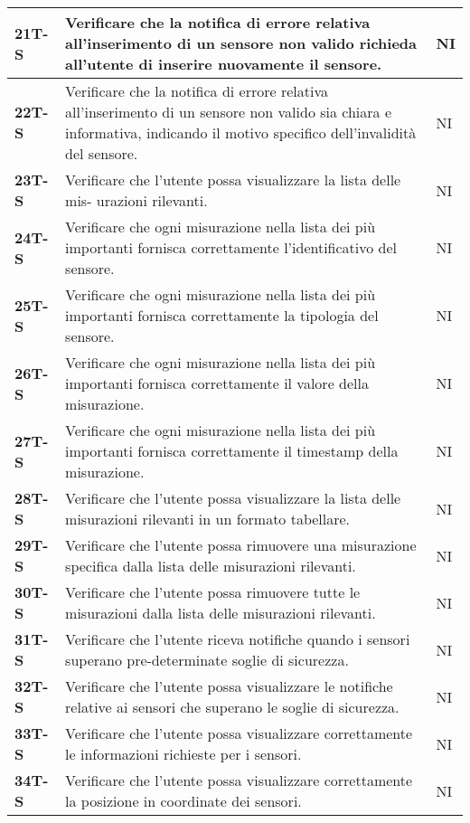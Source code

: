 \begin{longtable}{|>{\raggedright\arraybackslash}m{}|>{\raggedright\arraybackslash}m{}|>{\raggedright\arraybackslash}m{}|}
	\hline
	\textbf{21T-S}   & Verificare che la notifica di errore relativa all’inserimento di un sensore non valido richieda all’utente di inserire nuovamente il sensore. & NI\\
	\hline
	\textbf{22T-S}   & Verificare che la notifica di errore relativa all’inserimento di un sensore non valido sia chiara e informativa, indicando il motivo specifico dell’invalidità del sensore. & NI\\
	\hline
	\textbf{23T-S}   & Verificare che l’utente possa visualizzare la lista delle mis- urazioni rilevanti. & NI\\
	\hline
	\textbf{24T-S}   & Verificare che ogni misurazione nella lista dei più importanti fornisca correttamente l’identificativo del sensore. & NI\\
	\hline
	\textbf{25T-S}   & Verificare che ogni misurazione nella lista dei più importanti fornisca correttamente la tipologia del sensore. & NI\\
	\hline
	\textbf{26T-S}   & Verificare che ogni misurazione nella lista dei più importanti fornisca correttamente il valore della misurazione. & NI\\
	\hline
	\textbf{27T-S}   & Verificare che ogni misurazione nella lista dei più importanti fornisca correttamente il timestamp della misurazione. & NI\\
	\hline
	\textbf{28T-S}   & Verificare che l’utente possa visualizzare la lista delle misurazioni rilevanti in un formato tabellare. & NI\\ %
	\hline
	\textbf{29T-S}   & Verificare che l’utente possa rimuovere una misurazione specifica dalla lista delle misurazioni rilevanti. & NI\\
	\hline
	\textbf{30T-S}   & Verificare che l’utente possa rimuovere tutte le misurazioni dalla lista delle misurazioni rilevanti. & NI\\
	\hline
	\textbf{31T-S}   & Verificare che l’utente riceva notifiche quando i sensori superano pre-determinate soglie di sicurezza. & NI\\
	\hline
	\textbf{32T-S}   & Verificare che l’utente possa visualizzare le notifiche relative ai sensori che superano le soglie di sicurezza. & NI\\
	\hline
	\textbf{33T-S}   & Verificare che l’utente possa visualizzare correttamente le informazioni richieste per i sensori. & NI\\
	\hline
	\textbf{34T-S}   & Verificare che l’utente possa visualizzare correttamente la posizione in coordinate dei sensori. & NI\\

\end{longtable}
